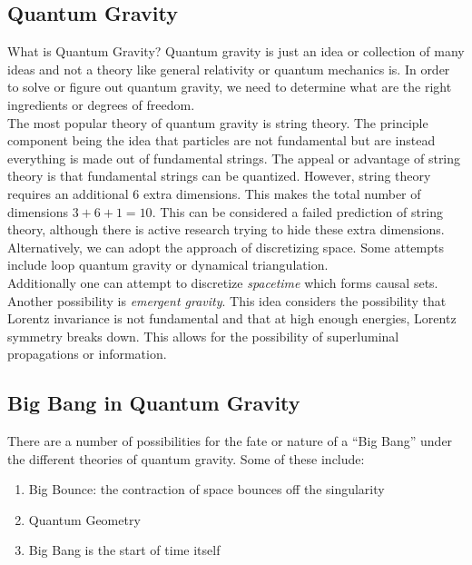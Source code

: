 \documentclass{article}
\begin{document}
\subsection{Quantum Gravity}

What is Quantum Gravity? Quantum gravity is just an idea or collection of many ideas and not a theory like general relativity or quantum mechanics is. In order to solve or figure out quantum gravity, we need to determine what are the right ingredients or degrees of freedom. \\

The most popular theory of quantum gravity is string theory. The principle component being the idea that particles are not fundamental but are instead everything is made out of fundamental strings. The appeal or advantage of string theory is that fundamental strings can be quantized. However, string theory requires an additional $6$ extra dimensions. This makes the total number of dimensions $3 + 6 + 1 = 10$. This can be considered a failed prediction of string theory, although there is active research trying to hide these extra dimensions.\\

Alternatively, we can adopt the approach of discretizing space. Some attempts include loop quantum gravity or dynamical triangulation. \\

Additionally one can attempt to discretize \textit{spacetime} which forms causal sets. \\

Another possibility is \textit{emergent gravity}. This idea considers the possibility that Lorentz invariance is not fundamental and that at high enough energies, Lorentz symmetry breaks down. This allows for the possibility of superluminal propagations or information.

\subsection{Big Bang in Quantum Gravity}

There are a number of possibilities for the fate or nature of a ``Big Bang'' under the different theories of quantum gravity. Some of these include:
\begin{enumerate}
    \item Big Bounce: the contraction of space bounces off the singularity
    \item Quantum Geometry
    \item Big Bang is the start of time itself
\end{enumerate}
\end{document}
